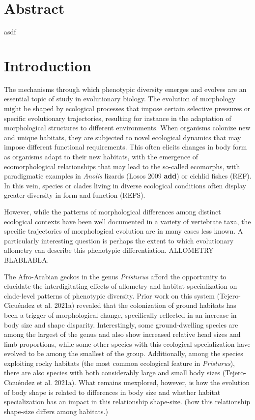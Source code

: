 \documentclass[
]{article}
\begin{document}
\newpage

\hypertarget{abstract}{%
\section{Abstract}\label{abstract}}

asdf

\newpage

\hypertarget{introduction}{%
\section{Introduction}\label{introduction}}

The mechanisms through which phenotypic diversity emerges and evolves
are an essential topic of study in evolutionary biology. The evolution
of morphology might be shaped by ecological processes that impose
certain selective pressures or specific evolutionary trajectories,
resulting for instance in the adaptation of morphological structures to
different environments. When organisms colonize new and unique habitats,
they are subjected to novel ecological dynamics that may impose
different functional requirements. This often elicits changes in body
form as organisms adapt to their new habitats, with the emergence of
ecomorphological relationships that may lead to the so-called ecomorphs,
with paradigmatic examples in \emph{Anolis} lizards (Losos 2009
\textbf{add}) or cichlid fishes (REF). In this vein, species or clades
living in diverse ecological conditions often display greater diversity
in form and function (REFS). \hfill\break

However, while the patterns of morphological differences among distinct
ecological contexts have been well documented in a variety of vertebrate
taxa, the specific trajectories of morphological evolution are in many
cases less known. A particularly interesting question is perhaps the
extent to which evolutionary allometry can describe this phenotypic
differentiation. ALLOMETRY BLABLABLA. \hfill\break

The Afro-Arabian geckos in the genus \emph{Pristurus} afford the
opportunity to elucidate the interdigitating effects of allometry and
habitat specialization on clade-level patterns of phenotypic diversity.
Prior work on this system (Tejero-Cicuéndez et al. 2021a) revealed that
the colonization of ground habitats has been a trigger of morphological
change, specifically reflected in an increase in body size and shape
disparity. Interestingly, some ground-dwelling species are among the
largest of the genus and also show increased relative head sizes and
limb proportions, while some other species with this ecological
specialization have evolved to be among the smallest of the group.
Additionally, among the species exploiting rocky habitats (the most
common ecological feature in \emph{Pristurus}), there are also species
with both considerably large and small body sizes (Tejero-Cicuéndez et
al. 2021a). What remains unexplored, however, is how the evolution of
body shape is related to differences in body size and whether habitat
specialization has an impact in this relationship shape-size. (how this
relationship shape-size differs among habitats.) \hfill\break
\end{document}
